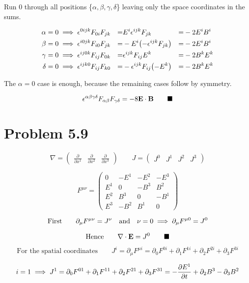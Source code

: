 \documentclass{article}
\begin{document}
Run 0 through all positions \{$\alpha,\beta,\gamma,\delta$\} leaving only the space coordinates in the sums. 

\begin{align*}
\alpha=0 &\implies \epsilon^{0ijk}F_{0i}F_{jk} &=& E^{i}\epsilon^{ijk}F_{jk}&=&-2E^{i}B^{i}\\
\beta=0 &\implies \epsilon^{i0jk}F_{i0}F_{jk} &=& -E^{i}\qty( -\epsilon^{ijk}F_{jk})&=&-2E^{i}B^{i}\\
\gamma=0 &\implies \epsilon^{ij0k}F_{ij}F_{0k} &=& \epsilon^{ijk}F_{ij}E^{k}&=&-2B^{k}E^{k}\\
\delta=0 &\implies \epsilon^{ijk0}F_{ij}F_{k0} &=& -\epsilon^{ijk}F_{ij}\qty(-E^{k} )&=&-2B^{k}E^{k}
\end{align*}

The $\alpha=0$ case is enough, because the remaining cases follow by symmetry.

\[ \epsilon^{\alpha\beta\gamma\delta}F_{\alpha\beta}F_{\gamma\delta}=-8\vb{E}\cdot \vb{B}\qquad\blacksquare\] 


\section*{Problem 5.9}

	\[ \nabla=\begin{pmatrix}  \frac{\partial}{\partial x^1} & \frac{\partial}{\partial x^2} & \frac{\partial}{\partial x^3} \end{pmatrix}\qquad J = \begin{pmatrix} J^0 & J^1 & J^2 & J^3 \end{pmatrix} \]

\[F^{\mu\nu}=\begin{pmatrix}
  0 & -E^1 & -E^2 & -E^3 \\
  E^1 & 0 & -B^3 & B^2 \\
  E^2 & B^3 & 0 & -B^1  \\
  E^3 & -B^2 & B^1 & 0
 \end{pmatrix}
\]

	 \[\text{First}\qquad \partial_\mu F^{\mu \nu} = J^\nu \qq{and} \nu=0\implies \partial_\mu F^{\mu 0} = J^0 \]

 \[\text{Hence}\qquad \vb{\nabla} \cdot \vb{E} = J^0 \qquad\blacksquare\]

 \[\text{For the spatial coordinates}\qquad  J^i=\partial_\mu F^{\mu i}=\partial_0 F^{0 i}+\partial_1 F^{1 i}+\partial_2 F^{2 i}+\partial_3 F^{3 i}
 \]

 \[ i=1\implies J^1=\partial_0 F^{0 1}+\partial_1 F^{1 1}+\partial_2 F^{2 1}+\partial_3 F^{3 1}=-\pdv{E^1}{t}+\partial_2 B^3-\partial_3 B^2
 \]
\end{document}
